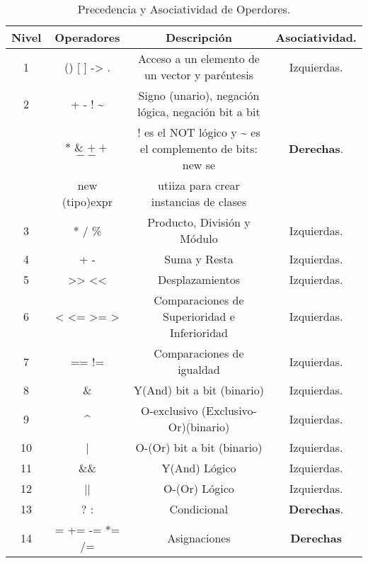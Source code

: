 \begin{table}[H]
        \centering
        \begin{tabular}{ c | c | c | c }

Nivel & Operadores & Descripción & Asociatividad. \\ \hline
1 & () [ ] -> . & Acceso a un elemento de un vector y paréntesis & Izquierdas. \\ \hline
2 & + - ! \textasciitilde{}  & Signo (unario), negación lógica, negación bit a bit& \\
  & * \& $++$ $--$ & ! es el NOT lógico y \textasciitilde{} es el complemento de bits: new se & \textbf{Derechas}. \\
  & new (tipo)expr& utiiza para crear instancias de clases &  \\ \hline
3 & * / \% & Producto, División y Módulo & Izquierdas. \\ \hline
4 & + - & Suma y Resta & Izquierdas. \\ \hline
5 & >> << & Desplazamientos & Izquierdas. \\ \hline
6 & < <= >= > & Comparaciones de Superioridad e Inferioridad & Izquierdas. \\ \hline
7 & == != & Comparaciones de igualdad & Izquierdas. \\ \hline
8 & \& & Y(And) bit a bit (binario) & Izquierdas. \\ \hline
9 & \textasciicircum{} & O-exclusivo (Exclusivo-Or)(binario) & Izquierdas. \\ \hline
10 & | & O-(Or) bit a bit (binario) & Izquierdas. \\ \hline
11 & \&\& & Y(And) Lógico & Izquierdas. \\ \hline
12 & || & O-(Or) Lógico & Izquierdas. \\ \hline
13 & ? : & Condicional &\textbf{Derechas}. \\ \hline
14 & = += -= *= /= & Asignaciones & \textbf{Derechas} \\ \hline
\end{tabular}
\\
\caption{Precedencia y Asociatividad de Operdores.}
\end{table}

